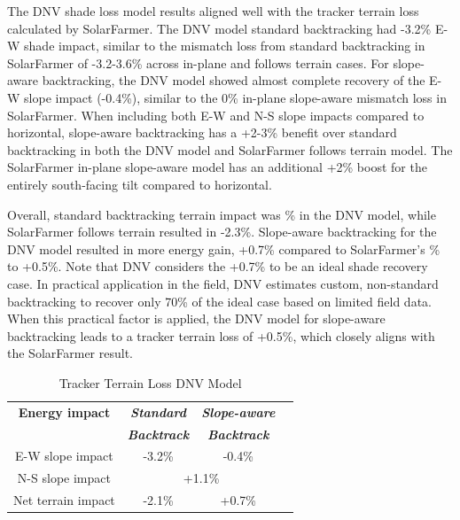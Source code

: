 \documentclass[conference]{IEEEtran}
\begin{document}
The DNV shade loss model results aligned well with the tracker terrain loss calculated by SolarFarmer. The DNV model standard backtracking had -3.2\% E-W shade impact, similar to the mismatch loss from standard backtracking in SolarFarmer of -3.2-3.6\% across in-plane and follows terrain cases. For slope-aware backtracking, the DNV model showed almost complete recovery of the E-W slope impact (-0.4\%), similar to the 0\% in-plane slope-aware mismatch loss in SolarFarmer. When including both E-W and N-S slope impacts compared to horizontal, slope-aware backtracking has a +2-3\% benefit over standard backtracking in both the DNV model and SolarFarmer follows terrain model. The SolarFarmer in-plane slope-aware model has an additional +2\% boost for the entirely south-facing tilt compared to horizontal.    

Overall, standard backtracking terrain impact was \% in the DNV model, while SolarFarmer follows terrain resulted in -2.3\%. Slope-aware backtracking for the DNV model resulted in more energy gain, +0.7\% compared to SolarFarmer's \% to +0.5\%. Note that DNV considers the +0.7\% to be an ideal shade recovery case. In practical application in the field, DNV estimates custom, non-standard backtracking to recover only 70\% of the ideal case based on limited field data. When this practical factor is applied, the DNV model for slope-aware backtracking leads to a tracker terrain loss of +0.5\%, which closely aligns with the SolarFarmer result.

\begin{table}[htbp]
\caption{Tracker Terrain Loss DNV Model}
\begin{center}
\begin{tabular}{|c|c|c|c|}
\hline
\textbf{Energy impact}& \textbf{\textit{Standard}}& \textbf{\textit{Slope-aware}} \\
  & \textbf{\textit{Backtrack}} & \textbf{\textit{Backtrack}} \\
\hline
E-W slope impact & -3.2\% & -0.4\% \\
\hline
N-S slope impact  & \multicolumn{2}{|c|}{+1.1\%}\\
\hline
Net terrain impact & -2.1\% & +0.7\% \\
\hline
\end{tabular}
\label{table:uneven-terrain}
\end{center}
\end{table}
\end{document}
